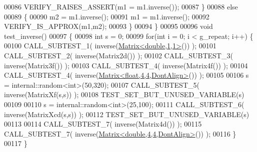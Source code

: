 \begin{DoxyCode}
00086     VERIFY\_RAISES\_ASSERT(m1 = m1.inverse());
00087   \}
00088   \textcolor{keywordflow}{else}
00089   \{
00090     m2 = m1.inverse();
00091     m1 = m1.inverse();
00092     VERIFY\_IS\_APPROX(m1,m2);
00093   \}
00094 \}
00095 
00096 \textcolor{keywordtype}{void} test\_inverse()
00097 \{
00098   \textcolor{keywordtype}{int} s = 0;
00099   \textcolor{keywordflow}{for}(\textcolor{keywordtype}{int} i = 0; i < g\_repeat; i++) \{
00100     CALL\_SUBTEST\_1( inverse(\hyperlink{group___core___module_class_eigen_1_1_matrix}{Matrix<double,1,1>}()) );
00101     CALL\_SUBTEST\_2( inverse(Matrix2d()) );
00102     CALL\_SUBTEST\_3( inverse(Matrix3f()) );
00103     CALL\_SUBTEST\_4( inverse(Matrix4f()) );
00104     CALL\_SUBTEST\_4( inverse(\hyperlink{group___core___module_class_eigen_1_1_matrix}{Matrix<float,4,4,DontAlign>}()) );
00105     
00106     s = internal::random<int>(50,320); 
00107     CALL\_SUBTEST\_5( inverse(MatrixXf(s,s)) );
00108     TEST\_SET\_BUT\_UNUSED\_VARIABLE(s)
00109     
00110     s = internal::random<int>(25,100);
00111     CALL\_SUBTEST\_6( inverse(MatrixXcd(s,s)) );
00112     TEST\_SET\_BUT\_UNUSED\_VARIABLE(s)
00113     
00114     CALL\_SUBTEST\_7( inverse(Matrix4d()) );
00115     CALL\_SUBTEST\_7( inverse(\hyperlink{group___core___module_class_eigen_1_1_matrix}{Matrix<double,4,4,DontAlign>}()) );
00116   \}
00117 \}
\end{DoxyCode}
